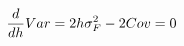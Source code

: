 \documentclass[preview]{standalone}
\begin{document}
\begin{align*}
\special{dvisvgm:raw <g id='unique000'>}\frac{d}{dh}Var = 2h\sigma_F^2 - 2Cov = 0\special{dvisvgm:raw </g>}
\end{align*}
\end{document}
